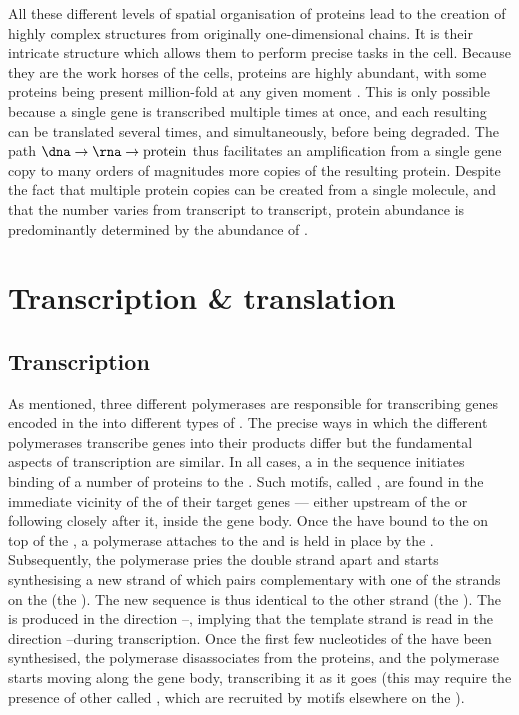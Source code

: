 All these different levels of spatial organisation of proteins lead to the
creation of highly complex structures from originally one-dimensional chains. It
is their intricate structure which allows them to perform precise tasks in the
cell. Because they are the work horses of the cells, proteins are highly
abundant, with some proteins being present million-fold at any given moment
\citep{Milo:2013}. This is only possible because a single gene is transcribed
multiple times at once, and each resulting \mrna can be translated several
times, and simultaneously, before being degraded. The path
\(\text{\dna}\rightarrow\text{\rna}\rightarrow\text{protein}\) thus facilitates
an amplification from a single gene copy to many orders of magnitudes more
copies of the resulting protein. Despite the fact that multiple protein copies
can be created from a single \mrna molecule, and that the number varies from
transcript to transcript, protein abundance is predominantly determined by the
abundance of \mrna[s] \citep{Li:2014,Jovanovic:2015,Csardi:2014}.

\section{Transcription \& translation}

\subsection{Transcription}

As mentioned, three different polymerases are responsible for transcribing genes
encoded in the \dna into different types of \rna. The precise ways in which the
different polymerases transcribe genes into their \rna products differ but the
fundamental aspects of transcription are similar. In all cases, a
 in the \dna sequence
initiates binding of a number of \tf proteins to the \dna. Such motifs, called
, are found in the immediate vicinity of the \tss of their
target genes --- either upstream of the \tss or following closely after it,
inside the gene body. Once the \tf[s] have bound to the \dna on top of the \tss,
a polymerase attaches to the \dna and is held in place by the \tf[s].
Subsequently, the polymerase pries the double strand apart and starts
synthesising a new strand of \rna which pairs complementary with one of the
strands on the \dna (the ). The new \rna[’s] sequence is
thus identical to the other \dna strand (the ). The \rna
is produced in the direction \fivep--\threep, implying that the template strand
is read in the direction \threep--\fivep during transcription. Once the first
few nucleotides of the \rna have been synthesised, the polymerase disassociates
from the \tf proteins, and the polymerase starts moving along the gene body,
transcribing it as it goes (this may require the presence of other \tf[s] called
, which are recruited by  motifs elsewhere
on the \dna).

